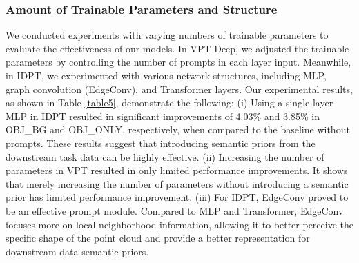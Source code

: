 \documentclass[10pt,twocolumn,letterpaper]{article}
\begin{document}
\subsubsection{Amount of Trainable Parameters and Structure} 


\begin{table}[t]
  \centering
  \caption{Effects of the number of trainable parameters and the structure of prompt generation module.}
  \label{table5}\end{table}

We conducted experiments with varying numbers of trainable parameters to evaluate the effectiveness of our models. In VPT-Deep, we adjusted the trainable parameters by controlling the number of prompts in each layer input. Meanwhile, in IDPT, we experimented with various network structures, including MLP, graph convolution (EdgeConv), and Transformer layers. Our experimental results, as shown in Table \ref{table5}, demonstrate the following: (i) Using a single-layer MLP in IDPT resulted in significant improvements of 4.03\% and 3.85\% in OBJ\_BG and OBJ\_ONLY, respectively, when compared to the baseline without prompts. These results suggest that introducing semantic priors from the downstream task data can be highly effective. (ii) Increasing the number of parameters in VPT resulted in only limited performance improvements. It shows that merely increasing the number of parameters without introducing a semantic prior has limited performance improvement. (iii) For IDPT, EdgeConv proved to be an effective prompt module. Compared to MLP and Transformer, EdgeConv focuses more on local neighborhood information, allowing it to better perceive the specific shape of the point cloud and provide a better representation for downstream data semantic priors.
\end{document}
